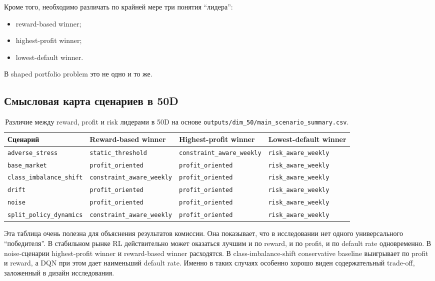 \documentclass[12pt,a4paper]{article}
\begin{document}
Кроме того, необходимо различать по крайней мере три понятия ``лидера'':
\begin{itemize}[leftmargin=*]
    \item reward-based winner;
    \item highest-profit winner;
    \item lowest-default winner.
\end{itemize}

В shaped portfolio problem это не одно и то же.

\subsection{Смысловая карта сценариев в 50D}

\begin{table}[H]
    \centering
    \small
    \begin{tabular}{p{}p{}p{}p{}}
        \toprule
        Сценарий & Reward-based winner & Highest-profit winner & Lowest-default winner \\
        \midrule
        \texttt{adverse\_stress} & \texttt{static\_threshold} & \texttt{constraint\_aware\_weekly} & \texttt{risk\_aware\_weekly} \\
        \texttt{base\_market} & \texttt{profit\_oriented} & \texttt{profit\_oriented} & \texttt{risk\_aware\_weekly} \\
        \texttt{class\_imbalance\_shift} & \texttt{constraint\_aware\_weekly} & \texttt{profit\_oriented} & \texttt{risk\_aware\_weekly} \\
        \texttt{drift} & \texttt{profit\_oriented} & \texttt{profit\_oriented} & \texttt{risk\_aware\_weekly} \\
        \texttt{noise} & \texttt{profit\_oriented} & \texttt{profit\_oriented} & \texttt{risk\_aware\_weekly} \\
        \texttt{split\_policy\_dynamics} & \texttt{constraint\_aware\_weekly} & \texttt{profit\_oriented} & \texttt{risk\_aware\_weekly} \\
        \bottomrule
    \end{tabular}
    \caption{Различие между reward, profit и risk лидерами в 50D на основе \texttt{outputs/dim\_50/main\_scenario\_summary.csv}.}
    \label{tab:ru-scenario-50}
\end{table}

Эта таблица очень полезна для объяснения результатов комиссии. Она показывает, что в исследовании нет одного универсального ``победителя''. В стабильном рынке RL действительно может оказаться лучшим и по reward, и по profit, и по default rate одновременно. В noise-сценарии highest-profit winner и reward-based winner расходятся. В class-imbalance-shift conservative baseline выигрывает по profit и reward, а DQN при этом дает наименьший default rate. Именно в таких случаях особенно хорошо виден содержательный trade-off, заложенный в дизайн исследования.
\end{document}
